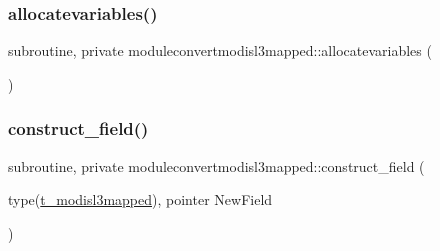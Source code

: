 \subsubsection{\texorpdfstring{allocatevariables()}{allocatevariables()}}
{\footnotesize\ttfamily subroutine, private moduleconvertmodisl3mapped\+::allocatevariables (\begin{DoxyParamCaption}{ }\end{DoxyParamCaption})\hspace{0.3cm}{\ttfamily [private]}}

\mbox{\label{namespacemoduleconvertmodisl3mapped_a74d74f88259002bec089959db1c1370b}} 
\subsubsection{\texorpdfstring{construct\+\_\+field()}{construct\_field()}}
{\footnotesize\ttfamily subroutine, private moduleconvertmodisl3mapped\+::construct\+\_\+field (\begin{DoxyParamCaption}\item[{type(\mbox{\hyperlink{structmoduleconvertmodisl3mapped_1_1t__modisl3mapped}{t\+\_\+modisl3mapped}}), pointer}]{New\+Field }\end{DoxyParamCaption})\hspace{0.3cm}{\ttfamily [private]}}

